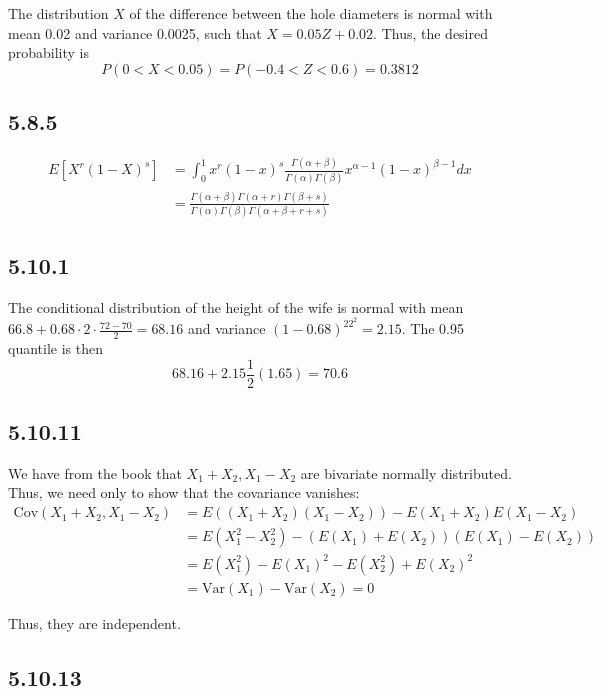 \documentclass[12pt,letterpaper]{article}
\theoremstyle{definition}
\newcommand{\var}[1]{\text{Var}\left(#1\right)}
\newcommand{\cov}[1]{\text{Cov}\left(#1\right)}
\begin{document}
The distribution $X$ of the difference between the hole diameters is normal with
mean 0.02 and variance 0.0025, such that $X = 0.05Z + 0.02$. Thus, the desired
probability is
\[
  P(0 < X < 0.05) = P(-0.4 < Z < 0.6) = 0.3812
\]

\subsection*{5.8.5}

\begin{align*}
  E[X^r(1-X)^s] &= \int_0^1 x^r(1-x)^s\frac{\Gamma(\alpha + \beta)}{\Gamma(\alpha)\Gamma(\beta)}x^{\alpha - 1}(1-x)^{\beta- 1}dx \\
                &= \frac{\Gamma(\alpha + \beta)\Gamma(\alpha+r)\Gamma(\beta + s)}{\Gamma(\alpha)\Gamma(\beta)\Gamma(\alpha  +\beta + r + s)} 
\end{align*}

\subsection*{5.10.1}

The conditional distribution of the height of the wife is normal with mean $66.8
+ 0.68 \cdot 2 \cdot \frac{72 - 70}{2} = 68.16$ and variance $(1-0.68)^22^2 =
2.15$. The 0.95 quantile is then
\[
  68.16 + 2.15\frac{1}{2}(1.65) = 70.6
\]

\subsection*{5.10.11}

We have from the book that $X_1 + X_2, X_1 - X_2$ are bivariate normally
distributed. Thus, we need only to show that the covariance vanishes:
\begin{align*}
  \cov{X_1 + X_2, X_1 - X_2} &= E((X_1 + X_2)(X_1 - X_2)) - E(X_1 + X_2)E(X_1 - X_2) \\
                             &= E(X_1^2 - X_2^2) - (E(X_1) + E(X_2))(E(X_1) - E(X_2)) \\
                             &= E(X_1^2) - E(X_1)^2 - E(X_2^2) + E(X_2)^2 \\
                             &= \var{X_1} - \var{X_2} = 0
\end{align*}

Thus, they are independent.

\subsection*{5.10.13}
\end{document}
